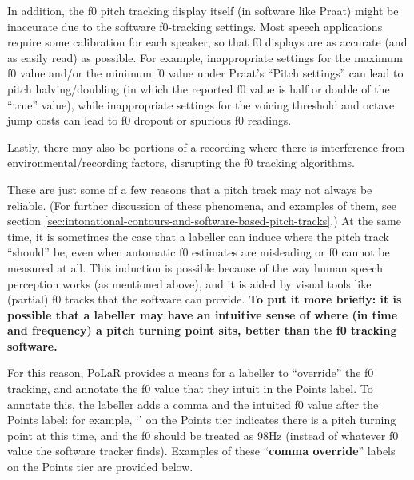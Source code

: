 \documentclass[11pt, twoside]{memoir}
\def\textlabel#1{{\relsize{-.5}\fontspec[Mapping=tex-text]{Roboto Mono}{#1}}}
\begin{document}
In addition, the f0 pitch tracking display itself (in software like Praat) might be inaccurate due to the software f0-tracking settings. Most speech applications require some calibration for each speaker, so that f0 displays are as accurate (and as easily read) as possible. For example, inappropriate settings for the maximum f0 value and/or the minimum f0 value under Praat’s “Pitch settings” can lead to pitch halving\slash doubling (in which the reported f0 value is half or double of the “true” value), while inappropriate settings for the voicing threshold and octave jump costs can lead to f0 dropout or spurious f0 readings.

Lastly, there may also be portions of a recording where there is interference from environmental\slash recording factors, disrupting the f0 tracking algorithms.

These are just some of a few reasons that a pitch track may not always be reliable. (For further discussion of these phenomena, and examples of them, see section \ref{sec:intonational-contours-and-software-based-pitch-tracks}.) At the same time, it is sometimes the case that a labeller can induce where the pitch track “should” be, even when automatic f0 estimates are misleading or f0 cannot be measured at all. This induction is possible because of the way human speech perception works (as mentioned above), and it is aided by visual tools like (partial) f0 tracks that the software can provide. \textbf{To put it more briefly: it is possible that a labeller may have an intuitive sense of where (in time and frequency) a pitch turning point sits, better than the f0 tracking software.}

For this reason, PoLaR provides a means for a labeller to “override” the f0 tracking, and annotate the f0 value that they intuit in the Points label. To annotate this, the labeller adds a comma and the intuited f0 value after the Points label: for example, ‘\textlabel{0,98}’ on the Points tier indicates there is a pitch turning point at this time, and the f0 should be treated as 98Hz (instead of whatever f0 value the software tracker finds). Examples of these “\textbf{comma override}” labels on the Points tier are provided below.
\end{document}
